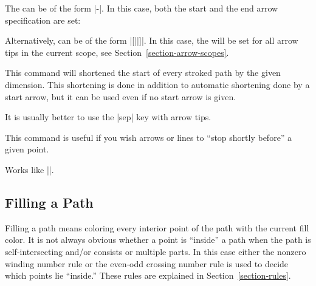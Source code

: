 \begin{command}{\pgfsetarrows{}}
    The  can be of the form |-|. In this case, both the
    start and the end arrow specification are set:
\begin{codeexample}[]
\begin{pgfpicture}
  \pgfpathmoveto{\pgfpointorigin}
  \pgfpathlineto{\pgfpoint{1cm}{0cm}}
\end{pgfpicture}
\end{codeexample}
    Alternatively,  can be of the form |[||]|.
    In this case, the  will be set for all arrow tips in the
    current scope, see Section~\ref{section-arrow-scopes}.
\end{command}

\begin{command}{\pgfsetshortenstart{}}
    This command will shortened the start of every stroked path by the given
    dimension. This shortening is done in addition to automatic shortening done
    by a start arrow, but it can be used even if no start arrow is given.

    It is usually better to use the |sep| key with arrow tips.

    This command is useful if you wish arrows or lines to ``stop shortly
    before'' a given point.
\begin{codeexample}[]
\begin{pgfpicture}
  \pgfpathcircle{\pgfpointorigin}{5mm}
  \pgfsetshortenstart{4pt}
  \pgfpathmoveto{\pgfpoint{5mm}{0cm}} %
  \pgfpathlineto{\pgfpoint{2cm}{0cm}}
\end{pgfpicture}
\end{codeexample}
\end{command}

\begin{command}{\pgfsetshortenend{}}
    Works like |\pgfsetshortenstart|.
\end{command}


\subsection{Filling a Path}
\label{section-fill}

Filling a path means coloring every interior point of the path with the current
fill color. It is not always obvious whether a point is ``inside'' a  path when
the path is self-intersecting and/or consists or multiple parts. In this case
either the nonzero winding number rule or the even-odd crossing number rule is
used to decide which points lie ``inside.'' These rules are explained in
Section~\ref{section-rules}.



